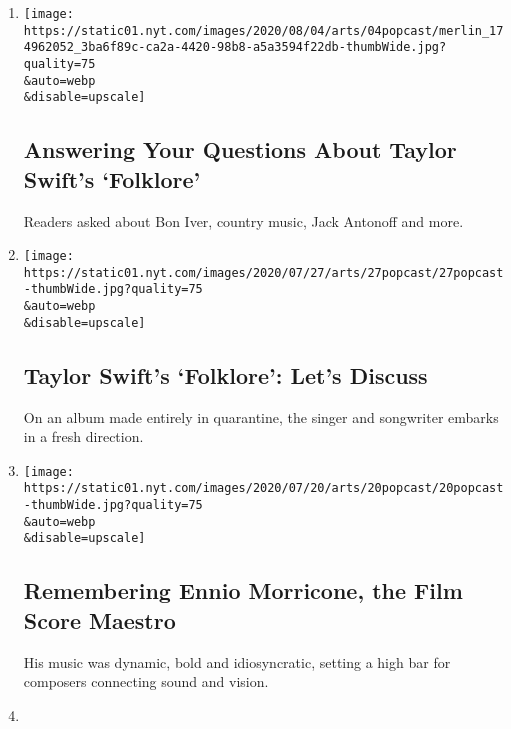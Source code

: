 \begin{enumerate}
\def\labelenumi{\arabic{enumi}.}
\item
  \href{/2020/08/04/arts/music/taylor-swift-folklore-questions.html}{}

  \texttt{[image: https://static01.nyt.com/images/2020/08/04/arts/04popcast/merlin\_174962052\_3ba6f89c-ca2a-4420-98b8-a5a3594f22db-thumbWide.jpg?quality=75\\\&auto=webp\\\&disable=upscale]}

  \hypertarget{answering-your-questions-about-taylor-swifts-folklore}{%
  \subsection{Answering Your Questions About Taylor Swift's
  `Folklore'}\label{answering-your-questions-about-taylor-swifts-folklore}}

  Readers asked about Bon Iver, country music, Jack Antonoff and more.
\item
  \href{/2020/07/27/arts/music/popcast-taylor-swift-folklore.html}{}

  \texttt{[image: https://static01.nyt.com/images/2020/07/27/arts/27popcast/27popcast-thumbWide.jpg?quality=75\\\&auto=webp\\\&disable=upscale]}

  \hypertarget{taylor-swifts-folklore-lets-discuss}{%
  \subsection{Taylor Swift's `Folklore': Let's
  Discuss}\label{taylor-swifts-folklore-lets-discuss}}

  On an album made entirely in quarantine, the singer and songwriter
  embarks in a fresh direction.
\item
  \href{/2020/07/20/arts/music/popcast-ennio-morricone.html}{}

  \texttt{[image: https://static01.nyt.com/images/2020/07/20/arts/20popcast/20popcast-thumbWide.jpg?quality=75\\\&auto=webp\\\&disable=upscale]}

  \hypertarget{remembering-ennio-morricone-the-film-score-maestro}{%
  \subsection{Remembering Ennio Morricone, the Film Score
  Maestro}\label{remembering-ennio-morricone-the-film-score-maestro}}

  His music was dynamic, bold and idiosyncratic, setting a high bar for
  composers connecting sound and vision.
\item
  \href{/2020/07/09/arts/music/popcast-run-the-jewels.html}{}


\end{enumerate}
